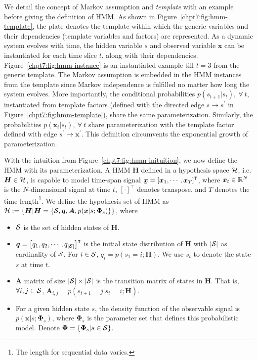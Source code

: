 We detail the concept of Markov assumption and \textit{template} with an example before giving the definition of HMM. As shown in Figure~\ref{chpt7:fig:hmm-template}, the plate denotes the template within which the generic variables and their dependencies (template variables and factors) are represented. As a dynamic system evolves with time, the hidden variable $s$ and observed variable $\bm{x}$ can be instantiated for each time slice $t$, along with their dependencies. Figure~\ref{chpt7:fig:hmm-instance} is an instantiated example till $t=3$ from the generic template. The Markov assumption is embedded in the HMM instances from the template since Markov independence is fulfilled no matter how long the system evolves. More importantly, the conditional probabilities $p(s_{t+1}|s_{t}),~\forall~t$, instantiated from template factors (defined with the directed edge $s\rightarrow s^{\prime}$ in Figure~\ref{chpt7:fig:hmm-template}), share the same parameterization. Similarly, the probabilities $p(\bm{x}_{t}|s_{t}),~\forall~t$ share parameterization with the template factor defined with edge $s^{\prime}\rightarrow \bm{x}^{\prime}$. This definition circumvents the exponential growth of parameterization. 

With the intuition from Figure~\ref{chpt7:fig:hmm-inituition}, we now define the HMM with its parameterization. A HMM $\bm{H}$ defined in a hypothesis space $\mathcal{H}$, i.e. $\bm{H} \in \mathcal{H}$, is capable to model time-span signal $\ubar{\bm{x}} = \left[ \bm{x}_1, \cdots, \bm{x}_T\right]^{\intercal}$, where $\bm{x}_t\in \mathbb{R}^{N}$ is the $N$-dimensional signal at time $t$, $[\cdot]^{\intercal}$ denotes transpose, and $T$ denotes the time length\footnote{The length for  sequential data varies.}. We define the hypothesis set of HMM as $\mathcal{H} := \{\bm{H} | \bm{H}=\{\mathcal{S}, \bm{q}, \bm{A}, p(\bm{x}|{s}; \bm{\Phi}_{s})\}\}$, where
\begin{itemize}
\item $\mathcal{S}$ is the set of hidden states of $\bm{H}$.
\item $\bm{q} = \left[ q_1, q_2, \cdots, q_{|\mathcal{S}|}\right]^\intercal$ is the initial state distribution of $\bm{H}$ with $|\mathcal{S}|$ as cardinality of $\mathcal{S}$. For $i \in \mathcal{S}$, $q_i = p(s_{1}=i;\bm{H})$. We use $s_t$ to denote the state $s$ at time $t$.
\item $\bm{A}$ matrix of size $|\mathcal{S}| \times |\mathcal{S}|$ is the transition matrix of states in $\bm{H}$. That is, $\forall i, j \in \mathcal{S}$,  $\bm{A}_{i,j} = p(s_{t+1}=j|s_{t}=i; \bm{H})$.
\item For a given hidden state $s$, the density function of the observable signal is $p({\bm{x}}|{s};\bm{\Phi}_{s})$, where $\bm{\Phi}_{s}$ is the parameter set that defines this probabilistic model. Denote $\bm{\Phi} = \left\{ \bm{\Phi}_{s}| s \in \mathcal{S} \right\}$.
\end{itemize}


